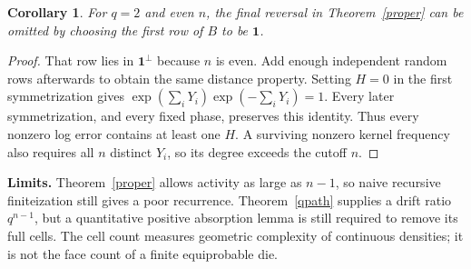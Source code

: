 \documentclass[11pt]{article}
\newtheorem{corollary}[theorem]{Corollary}
\begin{document}
\begin{corollary}
For $q=2$ and even $n$, the final reversal in Theorem~\ref{proper}
can be omitted by choosing the first row of $B$ to be $\boldsymbol1$.
\end{corollary}
\begin{proof}
That row lies in $\boldsymbol1^\perp$ because $n$ is even. Add enough
independent random rows afterwards to obtain the same distance property.
Setting $H=0$ in the first symmetrization gives
$\exp(\sum_iY_i)\exp(-\sum_iY_i)=1$. Every later symmetrization, and
every fixed phase, preserves this identity. Thus every nonzero log error
contains at least one $H$. A surviving nonzero kernel frequency also
requires all $n$ distinct $Y_i$, so its degree exceeds the cutoff $n$.
\end{proof}

\noindent\textbf{Limits.} Theorem~\ref{proper} allows activity as large
as $n-1$, so naive recursive finiteization still gives a poor recurrence.
Theorem~\ref{qpath} supplies a drift ratio $q^{n-1}$, but a quantitative
positive absorption lemma is still required to remove its full cells.
The cell count measures geometric complexity of continuous densities;
it is not the face count of a finite equiprobable die.
\end{document}
